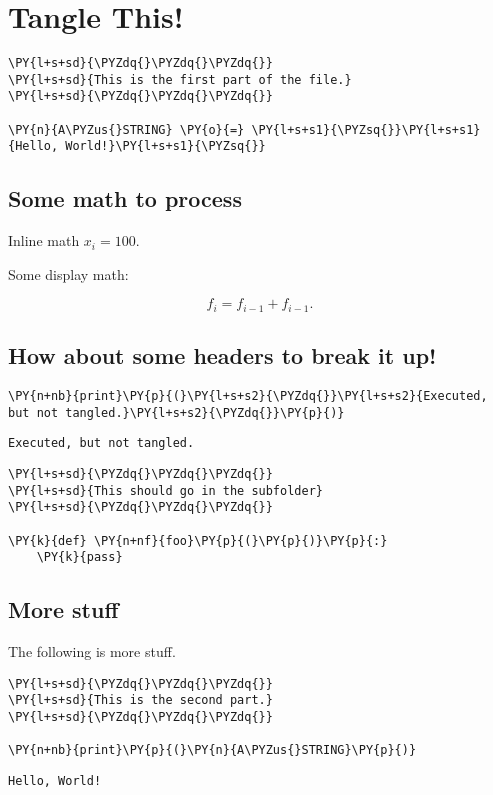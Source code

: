 \section{Tangle This!}

\begin{Verbatim}[commandchars=\\\{\}]
\PY{l+s+sd}{\PYZdq{}\PYZdq{}\PYZdq{}}
\PY{l+s+sd}{This is the first part of the file.}
\PY{l+s+sd}{\PYZdq{}\PYZdq{}\PYZdq{}}

\PY{n}{A\PYZus{}STRING} \PY{o}{=} \PY{l+s+s1}{\PYZsq{}}\PY{l+s+s1}{Hello, World!}\PY{l+s+s1}{\PYZsq{}}
\end{Verbatim}


\subsection{Some math to process}


Inline math $x_i = 100$.


Some display math:


\[
  f_i = f_{i-1} + f_{i-1}.
\]

\subsection{How about some headers to break it up!}


\begin{Verbatim}[commandchars=\\\{\}]
\PY{n+nb}{print}\PY{p}{(}\PY{l+s+s2}{\PYZdq{}}\PY{l+s+s2}{Executed, but not tangled.}\PY{l+s+s2}{\PYZdq{}}\PY{p}{)}
\end{Verbatim}

\begin{Verbatim}
Executed, but not tangled.

\end{Verbatim}

\begin{Verbatim}[commandchars=\\\{\}]
\PY{l+s+sd}{\PYZdq{}\PYZdq{}\PYZdq{}}
\PY{l+s+sd}{This should go in the subfolder}
\PY{l+s+sd}{\PYZdq{}\PYZdq{}\PYZdq{}}

\PY{k}{def} \PY{n+nf}{foo}\PY{p}{(}\PY{p}{)}\PY{p}{:}
    \PY{k}{pass}
\end{Verbatim}


\subsection{More stuff}


The following is more stuff.


\begin{Verbatim}[commandchars=\\\{\}]
\PY{l+s+sd}{\PYZdq{}\PYZdq{}\PYZdq{}}
\PY{l+s+sd}{This is the second part.}
\PY{l+s+sd}{\PYZdq{}\PYZdq{}\PYZdq{}}

\PY{n+nb}{print}\PY{p}{(}\PY{n}{A\PYZus{}STRING}\PY{p}{)}
\end{Verbatim}

\begin{Verbatim}
Hello, World!

\end{Verbatim}
